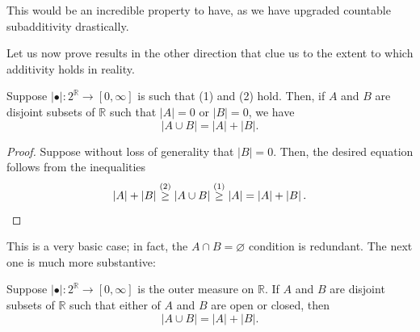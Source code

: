 \documentclass[11pt]{scrartcl}
\providecommand{\RR}{\mathbb R}
\providecommand{\abs}[1]{\left\lvert #1\right\rvert}
\begin{document}
This would be an incredible property to have,
as we have upgraded countable subadditivity drastically.

Let us now prove results in the other direction
that clue us to the extent to which additivity holds in reality.
\begin{prop}
    \label{prop:om-zero-meas-addend}
    Suppose $\abs\bullet\colon 2^\RR\to[0,\infty]$ is such that
    (1) and (2) hold.
    Then, if $A$ and $B$ are disjoint subsets of $\RR$
    such that $\abs A = 0$ or $\abs B = 0$, we have
    \begin{equation*}
	\abs{A\cup B} = \abs A+\abs B.
    \end{equation*}
\end{prop}

\begin{proof}
    Suppose without loss of generality that $\abs B = 0$.
    Then, the desired equation follows from the inequalities
    \begin{equation*}
	\abs A+\abs B \overset{(2)}\ge \abs{A\cup B}
	\overset{(1)}\ge \abs A
	= \abs A + \abs B.\qedhere
    \end{equation*}
\end{proof}

This is a very basic case; in fact, the $A\cap B = \varnothing$
condition is redundant.
The next one is much more substantive:
\begin{prop}
    \label{prop:om-open-closed-addend}
    Suppose $\abs\bullet\colon2^\RR\to[0,\infty]$ is the outer measure on $\RR$.
    If $A$ and $B$ are disjoint subsets of $\RR$
    such that either of $A$ and $B$ are open or closed, then
    \begin{equation*}
	\abs{A\cup B} = \abs A + \abs B.
    \end{equation*}
\end{prop}
\end{document}
